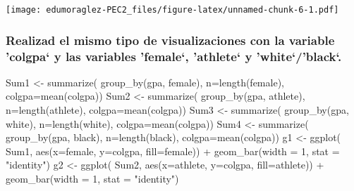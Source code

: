 \documentclass[
]{article}
\newenvironment{Shaded}{\begin{snugshade}}{\end{snugshade}}
\newcommand{\AttributeTok}[1]{\textcolor[rgb]{0.80,0.80,0.80}{#1}}
\newcommand{\DecValTok}[1]{\textcolor[rgb]{0.86,0.86,0.80}{#1}}
\newcommand{\FunctionTok}[1]{\textcolor[rgb]{0.94,0.94,0.56}{#1}}
\newcommand{\NormalTok}[1]{\textcolor[rgb]{0.80,0.80,0.80}{#1}}
\newcommand{\OtherTok}[1]{\textcolor[rgb]{0.94,0.94,0.56}{#1}}
\newcommand{\SpecialCharTok}[1]{\textcolor[rgb]{0.86,0.64,0.64}{#1}}
\newcommand{\StringTok}[1]{\textcolor[rgb]{0.80,0.58,0.58}{#1}}
\begin{document}
\texttt{[image: edumoraglez-PEC2\_files/figure-latex/unnamed-chunk-6-1.pdf]}

\hypertarget{realizad-el-mismo-tipo-de-visualizaciones-con-la-variable-colgpa-y-las-variables-female-athlete-y-whiteblack.}{%
\subsubsection{Realizad el mismo tipo de visualizaciones con la variable
'colgpa` y las variables 'female`, 'athlete` y
'white`/'black`.}\label{realizad-el-mismo-tipo-de-visualizaciones-con-la-variable-colgpa-y-las-variables-female-athlete-y-whiteblack.}}

\begin{Shaded}
\begin{Highlighting}[]
\NormalTok{Sum1 }\OtherTok{\textless{}{-}} \FunctionTok{summarize}\NormalTok{( }\FunctionTok{group\_by}\NormalTok{(gpa, female), }\AttributeTok{n=}\FunctionTok{length}\NormalTok{(female), }\AttributeTok{colgpa=}\FunctionTok{mean}\NormalTok{(colgpa))}
\NormalTok{Sum2 }\OtherTok{\textless{}{-}} \FunctionTok{summarize}\NormalTok{( }\FunctionTok{group\_by}\NormalTok{(gpa, athlete), }\AttributeTok{n=}\FunctionTok{length}\NormalTok{(athlete), }\AttributeTok{colgpa=}\FunctionTok{mean}\NormalTok{(colgpa))}
\NormalTok{Sum3 }\OtherTok{\textless{}{-}} \FunctionTok{summarize}\NormalTok{( }\FunctionTok{group\_by}\NormalTok{(gpa, white), }\AttributeTok{n=}\FunctionTok{length}\NormalTok{(white), }\AttributeTok{colgpa=}\FunctionTok{mean}\NormalTok{(colgpa))}
\NormalTok{Sum4 }\OtherTok{\textless{}{-}} \FunctionTok{summarize}\NormalTok{( }\FunctionTok{group\_by}\NormalTok{(gpa, black), }\AttributeTok{n=}\FunctionTok{length}\NormalTok{(black), }\AttributeTok{colgpa=}\FunctionTok{mean}\NormalTok{(colgpa))}
\NormalTok{g1 }\OtherTok{\textless{}{-}}  \FunctionTok{ggplot}\NormalTok{( Sum1, }\FunctionTok{aes}\NormalTok{(}\AttributeTok{x=}\NormalTok{female, }\AttributeTok{y=}\NormalTok{colgpa, }\AttributeTok{fill=}\NormalTok{female)) }\SpecialCharTok{+} \FunctionTok{geom\_bar}\NormalTok{(}\AttributeTok{width =} \DecValTok{1}\NormalTok{, }\AttributeTok{stat =} \StringTok{"identity"}\NormalTok{)}
\NormalTok{g2 }\OtherTok{\textless{}{-}}  \FunctionTok{ggplot}\NormalTok{( Sum2, }\FunctionTok{aes}\NormalTok{(}\AttributeTok{x=}\NormalTok{athlete, }\AttributeTok{y=}\NormalTok{colgpa, }\AttributeTok{fill=}\NormalTok{athlete)) }\SpecialCharTok{+} \FunctionTok{geom\_bar}\NormalTok{(}\AttributeTok{width =} \DecValTok{1}\NormalTok{, }\AttributeTok{stat =} \StringTok{"identity"}\NormalTok{)}

\end{Highlighting}
\end{Shaded}
\end{document}

